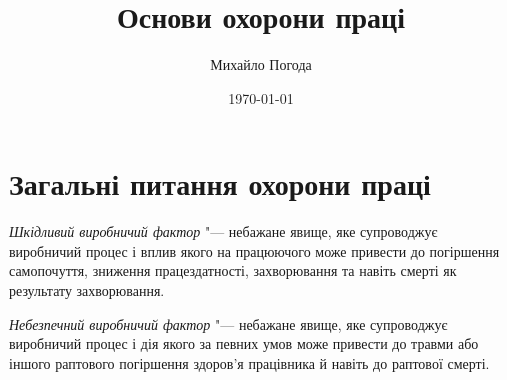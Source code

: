 \documentclass[a5paper,10pt,notitlepage,pdftex,headsepline]{scrartcl}
\author{Михайло Погода}
\title{Основи охорони праці}
\date{\today}
\begin{document}
\begin{titlepage}
  \maketitle
\end{titlepage}

\tableofcontents
\newpage

\section{Загальні питання охорони праці}
  \emph{Шкідливий виробничий фактор} "--- небажане явище, яке супроводжує
  виробничий процес і вплив якого на працюючого може привести до погіршення
  самопочуття, зниження працездатності, захворювання та навіть смерті як
  результату захворювання.

  \emph{Небезпечний виробничий фактор} "--- небажане явище, яке супроводжує
  виробничий процес і дія якого за певних умов може привести до травми або
  іншого раптового погіршення здоров’я працівника й навіть до раптової смерті.
\end{document}
